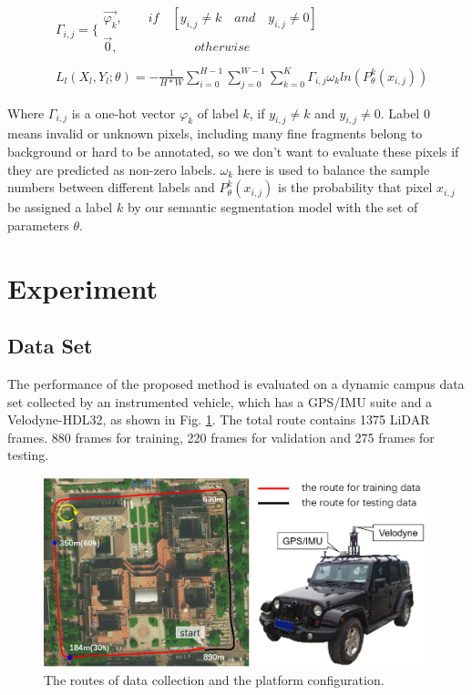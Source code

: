 	\begin{equation}
	\begin{split}
	&\varGamma_{i,j}=\{
	\begin{array}{lr}
	\overrightarrow{\varphi_k} ,\quad\quad if \quad [y_{i,j}\neq k \quad and\quad y_{i,j}\neq0]	\\
	\overrightarrow{0} ,\quad\quad\quad\quad\quad\quad  otherwise
	\end{array}	\\
	\\
	&\textit{}L_l(X_l,Y_l;\theta)=-\frac{1}{H*W}\sum_{i=0}^{H-1}\sum_{j=0}^{W-1}\sum_{k=0}^K{\varGamma_{i,j}\omega_{k}ln(P^k_{\theta}(x_{i,j}))}
	\end{split}
	\end{equation}
	
	Where $\varGamma_{i,j}$ is a one-hot vector $\varphi_k$ of label $k$, if $y_{i,j}\neq k$ and $y_{i,j}\neq0$. Label 0 means invalid or unknown pixels, including many fine fragments belong to background or hard to be annotated, so we don't want to evaluate these pixels if they are predicted as non-zero labels. $\omega_{k}$ here is used to balance the sample numbers between different labels and $P^k_{\theta}(x_{i,j})$ is the probability that pixel $x_{i,j}$ be assigned a label $k$ by our semantic segmentation model with the set of parameters $\theta$.
	
	\section{Experiment}
	\subsection{Data Set}
	The performance of the proposed method is evaluated on a dynamic campus data set collected by an instrumented vehicle, which has a GPS/IMU suite and a Velodyne-HDL32, as shown in Fig. \ref{fig:collect_route}. The total route contains 1375 LiDAR frames. 880 frames for training, 220 frames for validation and 275 frames for testing.
	
	\begin{figure}[ht]
		\centering
		\includegraphics[width=1.0\linewidth]{fig/collect_route}
		\caption{The routes of data collection and the platform configuration.}
		\label{fig:collect_route}
	\end{figure}
	
